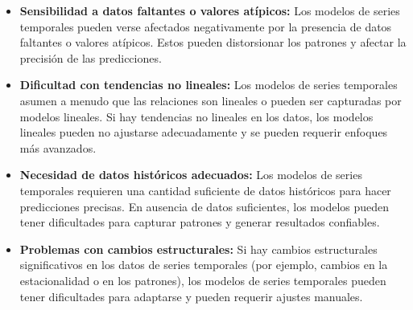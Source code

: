 \begin{itemize}
    \item \textbf{Sensibilidad a datos faltantes o valores atípicos:} Los modelos de series temporales pueden verse afectados negativamente por la presencia de datos faltantes o valores atípicos. Estos pueden distorsionar los patrones y afectar la precisión de las predicciones.
    \item \textbf{Dificultad con tendencias no lineales:} Los modelos de series temporales asumen a menudo que las relaciones son lineales o pueden ser capturadas por modelos lineales. Si hay tendencias no lineales en los datos, los modelos lineales pueden no ajustarse adecuadamente y se pueden requerir enfoques más avanzados.
    \item \textbf{Necesidad de datos históricos adecuados:} Los modelos de series temporales requieren una cantidad suficiente de datos históricos para hacer predicciones precisas. En ausencia de datos suficientes, los modelos pueden tener dificultades para capturar patrones y generar resultados confiables.
    \item \textbf{Problemas con cambios estructurales:} Si hay cambios estructurales significativos en los datos de series temporales (por ejemplo, cambios en la estacionalidad o en los patrones), los modelos de series temporales pueden tener dificultades para adaptarse y pueden requerir ajustes manuales.
\end{itemize}